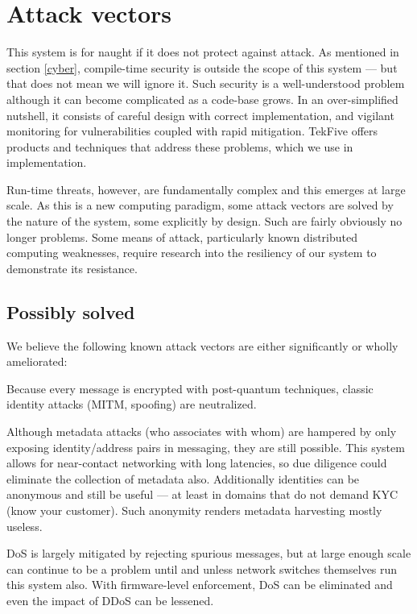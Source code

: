 \documentclass[10pt, twoside]{article}
\begin{document}
\section{Attack vectors} \label{vectors}

This system is for naught if it does not protect against attack. As mentioned in section \ref{cyber}, compile-time security is outside the scope of this system --- but that does not mean we will ignore it. Such security is a well-understood problem although it can become complicated as a code-base grows. In an over-simplified nutshell, it consists of careful design with correct implementation, and vigilant monitoring for vulnerabilities coupled with rapid mitigation. TekFive offers products and techniques that address these problems, which we use in implementation.

Run-time threats, however, are fundamentally complex and this emerges at large scale. As this is a new computing paradigm, some attack vectors are solved by the nature of the system, some explicitly by design. Such are fairly obviously no longer problems. Some means of attack, particularly known distributed computing weaknesses, require research into the resiliency of our system to demonstrate its resistance.

\subsection{Possibly solved}

We believe the following known attack vectors are either significantly or wholly ameliorated:

Because every message is encrypted with post-quantum techniques, classic identity attacks (MITM, spoofing) are neutralized.

Although metadata attacks (who associates with whom) are hampered by only exposing identity/address pairs in messaging, they are still possible. This system allows for near-contact networking with long latencies, so due diligence could eliminate the collection of metadata also. Additionally identities can be anonymous and still be useful --- at least in domains that do not demand KYC (know your customer). Such anonymity renders metadata harvesting mostly useless.

DoS is largely mitigated by rejecting spurious messages, but at large enough scale can continue to be a problem until and unless network switches themselves run this system also. With firmware-level enforcement, DoS can be eliminated and even the impact of DDoS can be lessened.
\end{document}
